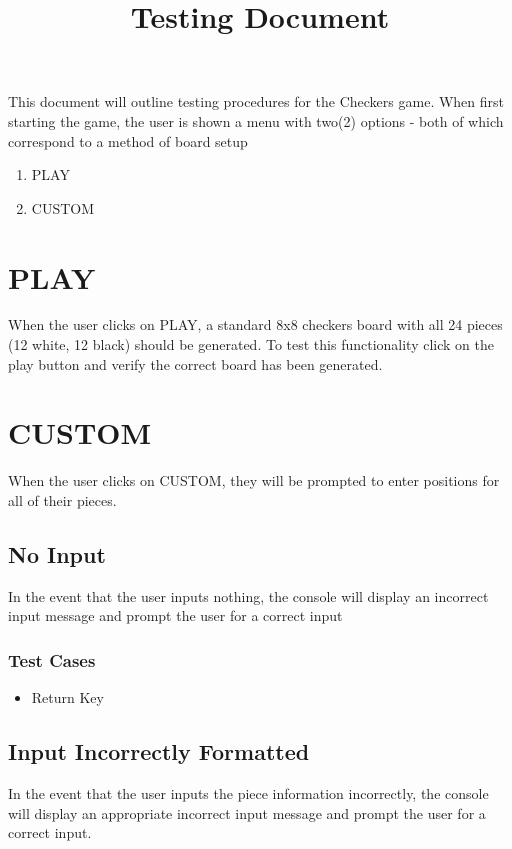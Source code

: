 \documentclass{article}
\title{\bf Testing Document}
\date{\vspace{-5ex}}
\begin{document}
\maketitle

This document will outline testing procedures for the Checkers game. When first starting the game, the user is shown a menu with two(2) options - both of which correspond to a method of board setup 
\begin{enumerate}
\item PLAY
\item CUSTOM
\end{enumerate}

\section{PLAY}
When the user clicks on PLAY, a standard 8x8 checkers board with all 24 pieces (12 white, 12 black) should be generated.
To test this functionality click on the play button and verify the correct board has been generated.

\section{CUSTOM}
When the user clicks on CUSTOM, they will be prompted to enter positions for all of their pieces.

\subsection{No Input}
In the event that the user inputs nothing, the console will display an incorrect input message and prompt the user for a correct input

\subsubsection{Test Cases}
\begin{itemize}
\item Return Key
\end{itemize}

\subsection{Input Incorrectly Formatted}
In the event that the user inputs the piece information incorrectly, the console will display an appropriate incorrect input message and prompt the user for a correct input. 
\end{document}
